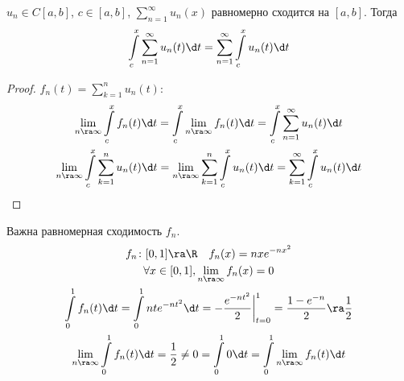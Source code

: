 \begin{conseq}
	$u_n \in C[a,b]$, $c \in [a, b]$, $\sum_{n=1}^\infty u_n(x)$ равномерно сходится на $[a,b]$.
	Тогда
	\[ \int\limits_c^x \sum_{n=1}^\infty u_n(t) \d t = \sum_{n=1}^\infty \int\limits_c^x u_n(t) \d t \]
\end{conseq}
\begin{proof}
	$f_n(t) = \sum_{k=1}^n u_n(t)$:
	\begin{gather*}
		\lim_{n \ra \infty} \int\limits_c^x f_n(t) \d t
		= \int\limits_c^x \lim_{n \ra \infty} f_n(t) \d t
		= \int\limits_c^x \sum_{n=1}^\infty u_n(t) \d t \\
		\lim_{n \ra \infty} \int\limits_c^x \sum_{k=1}^n u_n(t) \d t
		= \lim_{n \ra \infty} \sum_{k=1}^n \int\limits_c^x u_n(t) \d t
		= \sum_{k=1}^\infty \int\limits_c^x u_n(t) \d t
	\end{gather*}
\end{proof}

\begin{exmp}
	Важна равномерная сходимость $f_n$.
	\begin{gather*}
		f_n\colon [0,1] \ra \R \quad f_n(x) = nxe^{-nx^2} \\
		\forall x \in [0, 1], \lim_{n \ra \infty} f_n(x) = 0 \\
		\int\limits_0^1 f_n(t) \d t = \int\limits_0^1 nte^{-nt^2} \d t = -\frac{e^{-nt^2}}2\biggr|_{t=0}^1 = \frac{1-e^{-n}}2 \ra \frac12 \\
		\lim_{n \ra \infty} \int\limits_0^1 f_n(t) \d t
		= \frac12
		\ne 0
		= \int\limits_0^1 0 \d t
		= \int\limits_0^1 \lim_{n \ra \infty} f_n(t) \d t
	\end{gather*}
\end{exmp}